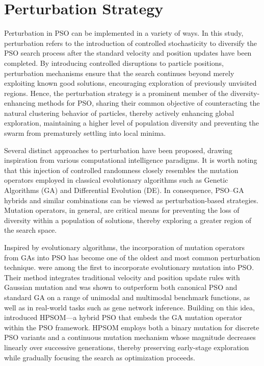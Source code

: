 {\section{Perturbation Strategy}

Perturbation in PSO can be implemented in a variety of ways.
In this study, perturbation refers to the introduction of controlled stochasticity to diversify the PSO search process after the standard velocity and position updates have been completed.
By introducing controlled disruptions to particle positions, perturbation mechanisms ensure that the search continues beyond merely exploiting known good solutions, encouraging exploration of previously unvisited regions.
Hence, 
the perturbation strategy is a prominent member of the diversity-enhancing methods for PSO, sharing their common objective of counteracting the natural clustering behavior of particles, thereby actively enhancing global exploration, maintaining a higher level of population diversity and preventing the swarm from prematurely settling into local minima.

Several distinct approaches to perturbation have been proposed, drawing inspiration from various computational intelligence paradigms.
It is worth noting that this injection of controlled randomness closely resembles the mutation operators employed in classical evolutionary algorithms such as Genetic Algorithms (GA) and Differential Evolution (DE).
In consequence, PSO–GA hybrids and similar combinations can be viewed as perturbation-based strategies. 
Mutation operators, in general, are critical means for preventing the loss of diversity within a population of solutions, thereby exploring a greater region of the search space.

Inspired by evolutionary algorithms, the incorporation of mutation operators from GAs into PSO has become one of the oldest and most common perturbation technique.
\citet{higashi2003gaussian} were among the first to incorporate evolutionary mutation into PSO. Their method integrates traditional velocity and position update rules with Gaussian mutation and was shown to outperform both canonical PSO and standard GA on a range of unimodal and multimodal benchmark functions, as well as in real-world tasks such as gene network inference.
Building on this idea, \citet{esmin2013hybrid} introduced HPSOM---a hybrid PSO that embeds the GA mutation operator within the PSO framework. HPSOM employs both a binary mutation for discrete PSO variants and a continuous mutation mechanism whose magnitude decreases linearly over successive generations, thereby preserving early-stage exploration while gradually focusing the search as optimization proceeds.

}
